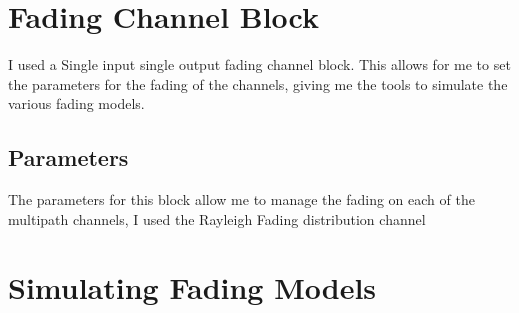 \documentclass[a4paper,12pt]{scrartcl}
\begin{document}
{	\section{Fading Channel Block}
	{
		I used a Single input single output fading channel block. This allows for me to set the parameters for the fading of the channels, giving me the tools to simulate the various fading models.
		\subsection{Parameters}
		{
			The parameters for this block allow me to manage the fading on each of the multipath channels, I used the Rayleigh Fading distribution channel
		}
	}
	\section{Simulating Fading Models}{
}}
\end{document}
